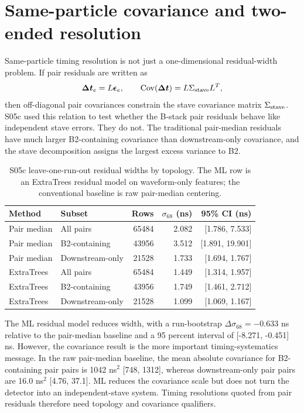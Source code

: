 \section{Same-particle covariance and two-ended resolution}

Same-particle timing resolution is not just a one-dimensional residual-width
problem.  If pair residuals are written as
\begin{equation}
  \boldsymbol{\Delta t}_e = L \boldsymbol{\epsilon}_e,
  \qquad
  {\rm Cov}(\boldsymbol{\Delta t}) = L \Sigma_{\rm stave} L^{T},
\end{equation}
then off-diagonal pair covariances constrain the stave covariance matrix
\(\Sigma_{\rm stave}\).  S05c used this relation to test whether the B-stack
pair residuals behave like independent stave errors.  They do not.  The
traditional pair-median residuals have much larger B2-containing covariance than
downstream-only covariance, and the stave decomposition assigns the largest
excess variance to B2.

\begin{table}[H]
\centering
\caption{S05c leave-one-run-out residual widths by topology.  The ML row is an
ExtraTrees residual model on waveform-only features; the conventional baseline
is raw pair-median centering.}
\begin{tabular}{llrrr}
\toprule
Method & Subset & Rows & \(\sigma_{68}\) (ns) & 95\% CI (ns) \\
\midrule
Pair median & All pairs & 65484 & 2.082 & [1.786, 7.533] \\
Pair median & B2-containing & 43956 & 3.512 & [1.891, 19.901] \\
Pair median & Downstream-only & 21528 & 1.733 & [1.694, 1.767] \\
ExtraTrees & All pairs & 65484 & 1.449 & [1.314, 1.957] \\
ExtraTrees & B2-containing & 43956 & 1.749 & [1.461, 2.712] \\
ExtraTrees & Downstream-only & 21528 & 1.099 & [1.069, 1.167] \\
\bottomrule
\end{tabular}
\end{table}

The ML residual model reduces width, with a run-bootstrap
\(\Delta\sigma_{68}=-0.633\) ns relative to the pair-median baseline and a
95 percent interval of [-8.271, -0.451] ns.  However, the covariance result is
the more important timing-systematics message.  In the raw pair-median baseline,
the mean absolute covariance for B2-containing pair pairs is
1042 ns\({}^2\) [748, 1312], whereas downstream-only pair pairs are
16.0 ns\({}^2\) [4.76, 37.1].  ML reduces the covariance scale but does not turn
the detector into an independent-stave system.  Timing resolutions quoted from
pair residuals therefore need topology and covariance qualifiers.

